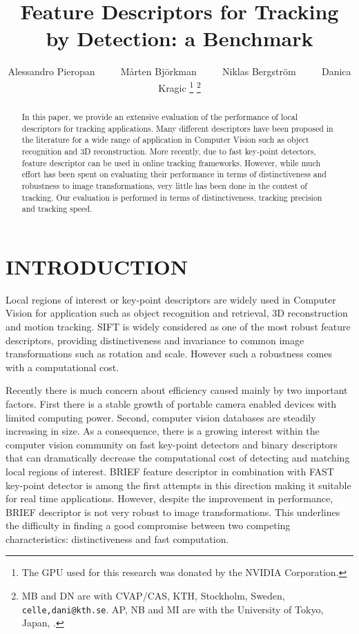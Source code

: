 \documentclass[letterpaper, 10pt, conference]{ieeeconf}
\title{\LARGE \bf Feature Descriptors for Tracking by Detection: a Benchmark}
\author{Alessandro Pieropan ~~~~ Mårten Bj{\"o}rkman  ~~~~ Niklas Bergstr{\"o}m ~~~~ Danica Kragic%
\thanks{The GPU used for this research was donated by the NVIDIA Corporation.}
\thanks{MB and DN are with CVAP/CAS, KTH, Stockholm, Sweden, {\tt celle,dani@kth.se}. AP, NB and MI are with the University of Tokyo, Japan, {\tt }.}}
\begin{document}
                                                                
                                                                                
\maketitle                                                                      
\thispagestyle{empty}                                                           
\pagestyle{empty}



\begin{abstract}
In this paper, we provide an extensive evaluation of the performance of local descriptors for tracking applications.
Many different descriptors have been proposed in the literature for a wide range of application in Computer Vision such as object recognition and 3D reconstruction. More recently, due to fast key-point detectors, feature descriptor can be used in online tracking frameworks. However, while much effort has been spent on evaluating their performance in terms of distinctiveness and robustness to image transformations, very little has been done in the contest of tracking. Our evaluation is performed in terms of distinctiveness, tracking precision and tracking speed. 

\end{abstract}

\section{INTRODUCTION}
\label{sec:introduction}

Local regions of interest or key-point descriptors are widely used in Computer Vision for application such as object recognition and retrieval, 3D reconstruction and motion tracking. SIFT \cite{lowe04} is widely considered as one of the most robust feature descriptors, providing distinctiveness and invariance to common image transformations such as rotation and scale. However such a robustness comes with a computational cost. 

Recently there is much concern about efficiency caused mainly by two important factors. First there is a stable growth of portable camera enabled devices with limited computing power. Second, computer vision databases are steadily increasing in size. As a consequence, there is a growing interest within the computer vision community on fast key-point detectors and binary descriptors that can dramatically decrease the computational cost of detecting and matching local regions of interest. BRIEF \cite{calonder10} feature descriptor in combination with FAST \cite{rosten06} key-point detector is among the first attempts in this direction making it suitable for real time applications. However, despite the improvement in performance, BRIEF descriptor is not very robust to image transformations. This underlines the difficulty in finding a good compromise between two competing characteristics: distinctiveness and fast computation. 
\end{document}

